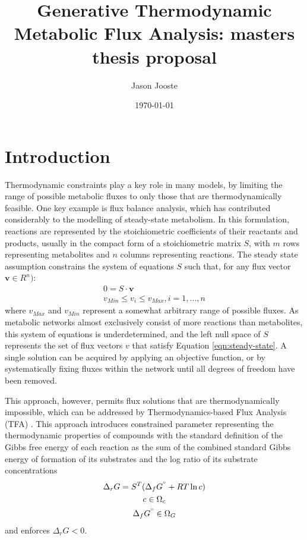 \documentclass[11pt]{article}
\title{ Generative Thermodynamic Metabolic Flux Analysis: masters thesis proposal}
\author{ Jason Jooste }
\date{\today}
\newcommand{\sdgf}{\Delta_fG^{\degree}}
\newcommand{\dgr}{\Delta_rG}
\begin{document}
	\maketitle	
	\pagebreak

\section{Introduction}

	Thermodynamic constraints play a key role in many models, by limiting the range of possible metabolic fluxes to only
	those that are thermodynamically feasible.
	One key example is flux balance analysis, which has contributed considerably to the modelling of steady-state metabolism.
	In this formulation, reactions are represented by the stoichiometric coefficients of their reactants and products,
	usually in the compact form of a stoichiometric matrix $S$, with $m$ rows representing metabolites and $n$ columns
	representing reactions.
	The steady state assumption constrains the system of equations $S$ such that, for any flux vector $\textbf{v}\in R^n)$:
	\begin{gather}
		\label{eqn:steady-state}
		0 = S\cdot \textbf{v} \\
		v_{Min} \leq v_i \leq v_{Max}, {i=1,...,n}
	\end{gather}
	where $v_{Max}$ and $v_{Min}$ represent a somewhat arbitrary range of possible fluxes.
	As metabolic networks almost exclusively consist of more reactions than metabolites, this system of equations is
	underdetermined, and the left null space of $S$ represents the set of flux vectors $v$ that satisfy Equation \ref{eqn:steady-state}.
	A single solution can be acquired by applying an objective function, or by systematically fixing fluxes within the network
	until all degrees of freedom have been removed.

	This approach, however, permits flux solutions that are thermodynamically impossible, which can be addressed by Thermodynamics-based Flux Analysis (TFA) \cite{HENRY_2007_tmfa,
		vishnu_2021_multiTFA, Salvy_2018_pytfa}.
	This approach introduces constrained parameter representing the thermodynamic properties of compounds with the standard definition of the Gibbs free energy of each reaction as the sum of the combined standard Gibbs energy of formation of its substrates and the log
	ratio of its substrate concentrations
	\begin{gather}
		\label{eqn:dgr}
		\dgr = S^T (\sdgf +  RT\ln c) \\
		c \in \Omega_c \\
		\sdgf \in \Omega_G
	\end{gather}
	and enforces $\dgr < 0$.
\end{document}
